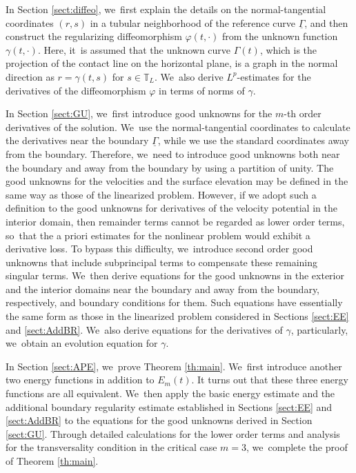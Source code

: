 \documentclass[JEP,XML,SOM,Unicode,NoFloatCountersInSection,published]{cedram}
\newcommand{\ul}[1]{\underline{#1}}
\newcommand{\itGamma}{\mathit{\Gamma}}
\theoremstyle{definition}
\begin{document}
In Section \ref{sect:diffeo}, we~first explain the details on the normal-tangential coordinates $(r,s)$ in a tubular neighborhood
of the reference curve $\ul{\itGamma}$, and then construct the regularizing diffeomorphism $\varphi(t,\cdot)$ from the unknown function $\gamma(t,\cdot)$.
Here, it~is assumed that the unknown curve $\itGamma(t)$, which is the projection of the contact line on the horizontal plane,
is a graph in the normal direction as $r=\gamma(t,s)$ for $s\in\mathbb{T}_L$. We~also derive $L^p$-estimates for the derivatives of the diffeomorphism $\varphi$ in terms of norms of $\gamma$.

In Section \ref{sect:GU}, we~first introduce good unknowns for the $m$-th order derivatives of the solution. We~use the normal-tangential coordinates to calculate the derivatives near the boundary $\ul{\itGamma}$,
while we use the standard coordinates away from the boundary.
Therefore, we~need to introduce good unknowns both near the boundary and away from the boundary by using a partition of unity.
The good unknowns for the velocities and the surface elevation may be defined in the same way as those of the linearized problem.
However, if we adopt such a definition to the good unknowns for derivatives of the velocity potential in the interior domain,
then remainder terms cannot be regarded as lower order terms, so~that the a priori estimates for the nonlinear problem would exhibit a derivative loss.
To bypass this difficulty, we~introduce second order good unknowns that include subprincipal terms to compensate these remaining singular terms. We~then derive equations for the good unknowns in the exterior and the interior domains near the boundary and away from the boundary, respectively,
and boundary conditions for them.
Such equations have essentially the same form as those in the linearized problem considered in Sections \ref{sect:EE} and \ref{sect:AddBR}. We~also derive equations for the derivatives of $\gamma$, particularly, we~obtain an evolution equation for $\gamma$.

In Section \ref{sect:APE}, we~prove Theorem \ref{th:main}. We~first introduce another two energy functions in addition to $E_m(t)$.
It turns out that these three energy functions are all equivalent. We~then apply the basic energy estimate and the additional boundary regularity estimate established in Sections \ref{sect:EE} and \ref{sect:AddBR}
to the equations for the good unknowns derived in Section \ref{sect:GU}.
Through detailed calculations for the lower order terms and analysis for the transversality condition in the critical case $m=3$, we~complete the proof of Theorem \ref{th:main}.
\end{document}
